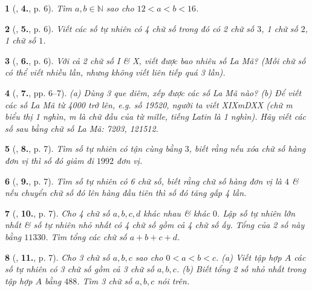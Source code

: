 \documentclass{article}
\newtheorem{baitoan}{}
\begin{document}
\begin{baitoan}[\cite{Binh_Toan_6_tap_1}, \textbf{4.}, p. 6]
	Tìm $a,b\in\mathbb{N}$ sao cho $12 < a < b < 16$.
\end{baitoan}

\begin{baitoan}[\cite{Binh_Toan_6_tap_1}, \textbf{5.}, p. 6]
	Viết các số tự nhiên có 4 chữ số trong đó có 2 chữ số $3$, 1 chữ số $2$, 1 chữ số $1$.
\end{baitoan}

\begin{baitoan}[\cite{Binh_Toan_6_tap_1}, \textbf{6.}, p. 6]
	Với cả 2 chữ số I \& X, viết được bao nhiêu số La Mã? (Mỗi chữ số có thể viết nhiều lần, nhưng không viết liên tiếp quá 3 lần).
\end{baitoan}

\begin{baitoan}[\cite{Binh_Toan_6_tap_1}, \textbf{7.}, pp. 6--7]
	(a) Dùng 3 que diêm, xếp được các số La Mã nào? (b) Để viết các số La Mã từ 4000 trở lên, e.g. số 19520, người ta viết XIXmDXX (chữ m biểu thị \emph{1 nghìn}, m là chữ đầu của từ \emph{mille}, tiếng Latin là 1 nghìn). Hãy viết các số sau bằng chữ số La Mã: 7203, 121512.
\end{baitoan}

\begin{baitoan}[\cite{Binh_Toan_6_tap_1}, \textbf{8.}, p. 7]
	Tìm số tự nhiên có tận cùng bằng $3$, biết rằng nếu xóa chữ số hàng đơn vị thì số đó giảm đi $1992$ đơn vị.
\end{baitoan}

\begin{baitoan}[\cite{Binh_Toan_6_tap_1}, \textbf{9.}, p. 7]
	Tìm số tự nhiên có 6 chữ số, biết rằng chữ số hàng đơn vị là $4$ \& nếu chuyển chữ số đó lên hàng đầu tiên thì số đó tăng gấp 4 lần.
\end{baitoan}

\begin{baitoan}[\cite{Binh_Toan_6_tap_1}, \textbf{10.}, p. 7]
	Cho 4 chữ số $a,b,c,d$ khác nhau \& khác $0$. Lập số tự nhiên lớn nhất \& số tự nhiên nhỏ nhất có 4 chữ số gồm cả 4 chữ số ấy. Tổng của 2 số này bằng $11330$. Tìm tổng các chữ số $a + b + c + d$.
\end{baitoan}

\begin{baitoan}[\cite{Binh_Toan_6_tap_1}, \textbf{11.}, p. 7]
	Cho 3 chữ số $a,b,c$ sao cho $0 < a < b < c$. (a) Viết tập hợp $A$ các số tự nhiên có 3 chữ số gồm cả 3 chữ số $a,b,c$. (b) Biết tổng 2 số nhỏ nhất trong tập hợp $A$ bằng $488$. Tìm 3 chữ số $a,b,c$ nói trên.
\end{baitoan}
\end{document}

